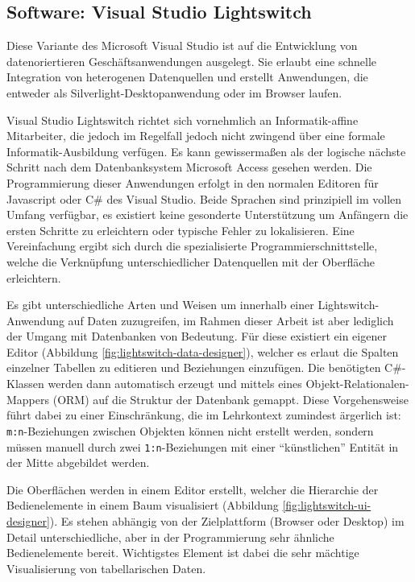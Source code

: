 \subsection{Software: Visual Studio Lightswitch}

Diese Variante des Microsoft Visual Studio ist auf die Entwicklung von datenoriertieren Geschäftsanwendungen ausgelegt. Sie erlaubt eine schnelle Integration von heterogenen Datenquellen und erstellt Anwendungen, die entweder als Silverlight-Desktopanwendung oder im Browser laufen.

Visual Studio Lightswitch richtet sich vornehmlich an Informatik-affine Mitarbeiter, die jedoch im Regelfall jedoch nicht zwingend über eine formale Informatik-Ausbildung verfügen. Es kann gewissermaßen als der logische nächste Schritt nach dem Datenbanksystem Microsoft Access gesehen werden. Die Programmierung dieser Anwendungen erfolgt in den normalen Editoren für Javascript oder C\# des Visual Studio. Beide Sprachen sind prinzipiell im vollen Umfang verfügbar, es existiert keine gesonderte Unterstützung um Anfängern die ersten Schritte zu erleichtern oder typische Fehler zu lokalisieren. Eine Vereinfachung ergibt sich durch die spezialisierte Programmierschnittstelle, welche die Verknüpfung unterschiedlicher Datenquellen mit der Oberfläche erleichtern.

Es gibt unterschiedliche Arten und Weisen um innerhalb einer Lightswitch-Anwendung auf Daten zuzugreifen, im Rahmen dieser Arbeit ist aber lediglich der Umgang mit Datenbanken von Bedeutung. Für diese existiert ein eigener Editor (Abbildung \ref{fig:lightswitch-data-designer}), welcher es erlaut die Spalten einzelner Tabellen zu editieren und Beziehungen einzufügen. Die benötigten C\#-Klassen werden dann automatisch erzeugt und mittels eines Objekt-Relationalen-Mappers (ORM) auf die Struktur der Datenbank gemappt. Diese Vorgehensweise führt dabei zu einer Einschränkung, die im Lehrkontext zumindest ärgerlich ist: \lstinline{m:n}-Beziehungen zwischen Objekten können nicht erstellt werden, sondern müssen manuell durch zwei \lstinline{1:n}-Beziehungen mit einer "`künstlichen"' Entität in der Mitte abgebildet werden.

Die Oberflächen werden in einem Editor erstellt, welcher die Hierarchie der Bedienelemente in einem Baum visualisiert (Abbildung \ref{fig:lightswitch-ui-designer}). Es stehen abhängig von der Zielplattform (Browser oder Desktop) im Detail unterschiedliche, aber in der Programmierung sehr ähnliche Bedienelemente bereit. Wichtigstes Element ist dabei die sehr mächtige Visualisierung von tabellarischen Daten.

